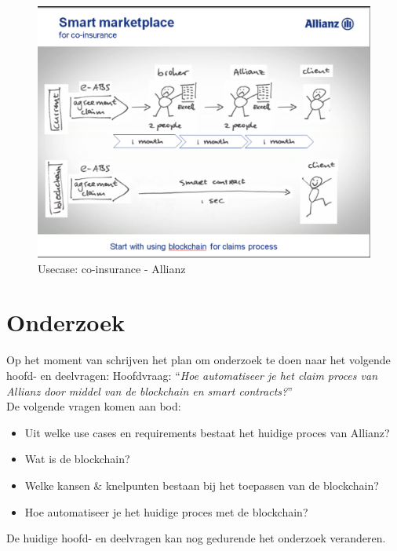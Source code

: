 \begin{figure}[h!]
    \begin{center}
        \includegraphics[scale=0.5]{images/allianz-blockchain}
        \caption{Usecase: co-insurance - Allianz}
        \label{fig:allianz-blockchain}
    \end{center}
\end{figure}

\section{Onderzoek}
Op het moment van schrijven het plan om onderzoek te doen naar het volgende hoofd- en deelvragen:
Hoofdvraag: ``\textit{Hoe automatiseer je het claim proces van Allianz door middel van de blockchain en smart contracts?}''\\
De volgende vragen komen aan bod:
\begin{itemize}
  \item Uit welke use cases en requirements bestaat het huidige proces van Allianz?
  \item Wat is de blockchain?
  \item Welke kansen \& knelpunten bestaan bij het toepassen van de blockchain?
  \item Hoe automatiseer je het huidige proces met de blockchain?
\end{itemize}
De huidige hoofd- en deelvragen kan nog gedurende het onderzoek veranderen.